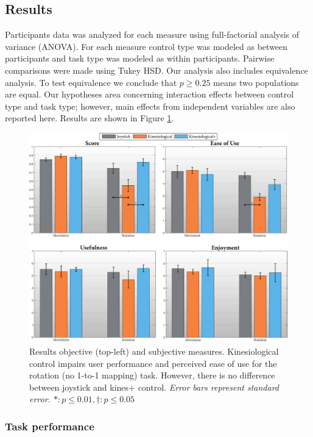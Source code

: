 \documentclass{sigchi}
\begin{document}
\subsection{Results}

Participants data was analyzed for each measure using full-factorial analysis of variance (ANOVA). For each measure control type was modeled as between participants and task type was modeled as within participants. Pairwise comparisons were made using Tukey HSD. Our analysis also includes equivalence analysis. To test equivalence we conclude that $p\geq0.25$ means two populations are equal. Our hypotheses area concerning interaction effects between control type and task type; however, main effects from independent variables are also reported here. Results are shown in Figure \ref{fig:bar_chart}.

\begin{figure}[t]
	\centering
	\includegraphics[width=\columnwidth]{figures/bar_charts.pdf}
	\caption{Results objective (top-left) and subjective measures. Kinesiological control impairs user performance and perceived ease of use for the rotation (no 1-to-1 mapping) task. However, there is no difference between joystick and kines+ control. \em{Error bars represent standard error.} $\ast: p \leq 0.01, \dagger:p \leq 0.05 $ }
	\label{fig:bar_chart}
\end{figure} 

\subsubsection{Task performance}
\end{document}
